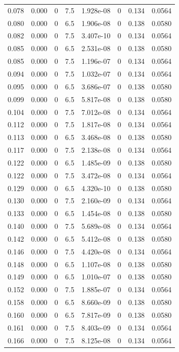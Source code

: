 \documentclass[preview]{standalone}
\begin{document}
{{\begin{tabular}{L{1.2cm}C{1.2cm} C{0.3cm}C{0.5cm} C{1.4cm}C{1.4cm} C{1.4cm}C{1.4cm}}
  0.078  &  0.000  & 0     & 7.5 &  1.928e-08  & 0  & 0.134 &  0.0564   \\ 
  0.080  &  0.000  & 0     & 6.5 &  1.906e-08  & 0  & 0.138 &  0.0580   \\ 
  0.082  &  0.000  & 0     & 7.5 &  3.407e-10  & 0  & 0.134 &  0.0564   \\ 
  0.085  &  0.000  & 0     & 6.5 &  2.531e-08  & 0  & 0.138 &  0.0580   \\ 
  0.085  &  0.000  & 0     & 7.5 &  1.196e-07  & 0  & 0.134 &  0.0564   \\ 
  0.094  &  0.000  & 0     & 7.5 &  1.032e-07  & 0  & 0.134 &  0.0564   \\ 
  0.095  &  0.000  & 0     & 6.5 &  3.686e-07  & 0  & 0.138 &  0.0580   \\ 
  0.099  &  0.000  & 0     & 6.5 &  5.817e-08  & 0  & 0.138 &  0.0580   \\ 
  0.104  &  0.000  & 0     & 7.5 &  7.012e-08  & 0  & 0.134 &  0.0564   \\ 
  0.112  &  0.000  & 0     & 7.5 &  1.817e-08  & 0  & 0.134 &  0.0564   \\ 
  0.113  &  0.000  & 0     & 6.5 &  3.468e-08  & 0  & 0.138 &  0.0580   \\ 
  0.117  &  0.000  & 0     & 7.5 &  2.138e-08  & 0  & 0.134 &  0.0564   \\ 
  0.122  &  0.000  & 0     & 6.5 &  1.485e-09  & 0  & 0.138 &  0.0580   \\ 
  0.122  &  0.000  & 0     & 7.5 &  3.472e-08  & 0  & 0.134 &  0.0564   \\ 
  0.129  &  0.000  & 0     & 6.5 &  4.320e-10  & 0  & 0.138 &  0.0580   \\ 
  0.130  &  0.000  & 0     & 7.5 &  2.160e-09  & 0  & 0.134 &  0.0564   \\ 
  0.133  &  0.000  & 0     & 6.5 &  1.454e-08  & 0  & 0.138 &  0.0580   \\ 
  0.140  &  0.000  & 0     & 7.5 &  5.689e-08  & 0  & 0.134 &  0.0564   \\ 
  0.142  &  0.000  & 0     & 6.5 &  5.412e-08  & 0  & 0.138 &  0.0580   \\ 
  0.146  &  0.000  & 0     & 7.5 &  4.420e-08  & 0  & 0.134 &  0.0564   \\ 
  0.148  &  0.000  & 0     & 6.5 &  1.107e-08  & 0  & 0.138 &  0.0580   \\ 
  0.149  &  0.000  & 0     & 6.5 &  1.010e-07  & 0  & 0.138 &  0.0580   \\ 
  0.152  &  0.000  & 0     & 7.5 &  1.885e-07  & 0  & 0.134 &  0.0564   \\ 
  0.158  &  0.000  & 0     & 6.5 &  8.660e-09  & 0  & 0.138 &  0.0580   \\ 
  0.160  &  0.000  & 0     & 6.5 &  7.817e-09  & 0  & 0.138 &  0.0580   \\ 
  0.161  &  0.000  & 0     & 7.5 &  8.403e-09  & 0  & 0.134 &  0.0564   \\ 
  0.166  &  0.000  & 0     & 7.5 &  8.125e-08  & 0  & 0.134 &  0.0564   \\ 
\hline 
\end{tabular} 

}}
\end{document}
